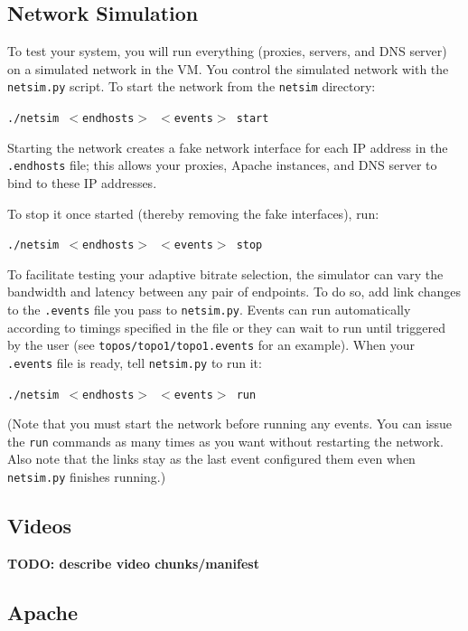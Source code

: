 \documentclass{article}
\begin{document}
\subsection{Network Simulation}
\label{sec:netsim}

To test your system, you will run everything (proxies, servers, and DNS server)
on a simulated network in the VM. You control the simulated network with the
\texttt{netsim.py} script. To start the network from the \texttt{netsim}
directory:
\begin{center}
	\texttt{./netsim $<$endhosts$>$ $<$events$>$ start}
\end{center}
Starting the network creates a fake network interface for each IP address in
the \texttt{.endhosts} file; this allows your proxies, Apache instances, and
DNS server to bind to these IP addresses.

To stop it once started (thereby removing the fake interfaces), run:
\begin{center}
	\texttt{./netsim $<$endhosts$>$ $<$events$>$ stop}
\end{center}

To facilitate testing your adaptive bitrate selection, the simulator can vary
the bandwidth and latency between any pair of endpoints. To do so, add link
changes to the \texttt{.events} file you pass to \texttt{netsim.py}. Events can
run automatically according to timings specified in the file or they can wait
to run until triggered by the user (see \texttt{topos/topo1/topo1.events} for
an example). When your \texttt{.events} file is ready, tell \texttt{netsim.py}
to run it:
\begin{center}
	\texttt{./netsim $<$endhosts$>$ $<$events$>$ run}
\end{center}
(Note that you must start the network before running any events. You can issue
the \texttt{run} commands as many times as you want without restarting the
network. Also note that the links stay as the last event configured them even
when \texttt{netsim.py} finishes running.)





\subsection{Videos}
\label{sec:videos}

\textbf{TODO: describe video chunks/manifest}



\subsection{Apache}
\label{sec:apache}
\end{document}
